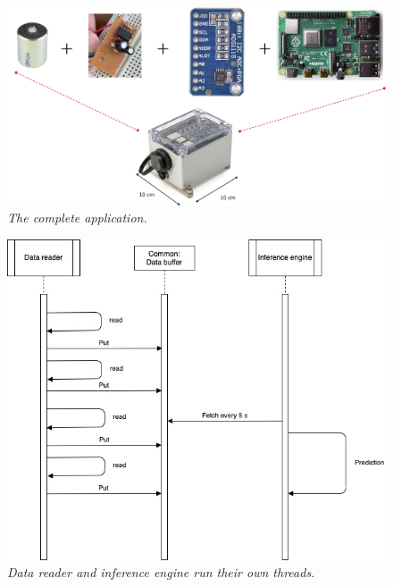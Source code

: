 \begin{figure}[H]
  \centering
  \caption[The complete application.]{\emph{The complete application.}} \label{fig:application}
  \includegraphics[scale = 0.14]{figures/application.jpg}
\end{figure}

\begin{figure}[H]
  \centering
  \caption[Data reader and inference engine run their own threads.]{\emph{Data reader and inference engine run their own threads.}} \label{fig:software_architecture}
  \includegraphics[scale = 0.7]{figures/software_architecture.jpg}
\end{figure}

